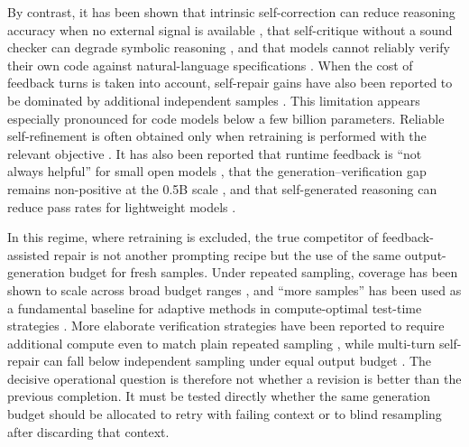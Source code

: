\documentclass{article}
\numberwithin{equation}{section}  %
\theoremstyle{definition}
\begin{document}
By contrast, it has been shown that intrinsic self-correction can reduce reasoning accuracy when no
external signal is available \citep{huang2024cannot,valmeekam2023self}, that self-critique without a
sound checker can degrade symbolic reasoning \citep{stechly2025selfverification}, and that models
cannot reliably verify their own code against natural-language specifications
\citep{jin2025selfcritiquefail}. When the cost of feedback turns is taken into account,
self-repair gains have also been reported to be dominated by additional independent samples
\citep{olausson2024selfrepair}. This limitation appears especially pronounced for code models below
a few billion parameters. Reliable self-refinement is often obtained only when retraining is performed
with the relevant objective \citep{ding2024cycle,cho2025cocos,jiang2024ledex}. It has also been
reported that runtime feedback is ``not always helpful'' for small open models
\citep{tian2024debugbench}, that the generation--verification gap remains non-positive at the 0.5B
scale \citep{song2025mindthegap}, and that self-generated reasoning can reduce pass rates for
lightweight models \citep{yang2024cotton}.

In this regime, where retraining is excluded, the true competitor of feedback-assisted repair is not
another prompting recipe but the use of the same output-generation budget for fresh samples. Under
repeated sampling, coverage has been shown to scale across broad budget ranges
\citep{brown2024monkeys}, and ``more samples'' has been used as a fundamental baseline for adaptive
methods in compute-optimal test-time strategies \citep{snell2024testtime,damani2024hard}. More
elaborate verification strategies have been reported to require additional compute even to match
plain repeated sampling \citep{singhi2025solve}, while multi-turn self-repair can fall below
independent sampling under equal output budget \citep{zheng2025multiturn}. The decisive operational
question is therefore not whether a revision is better than the previous completion. It must be
tested directly whether the same generation budget should be allocated to retry with failing context
or to blind resampling after discarding that context.
\end{document}
